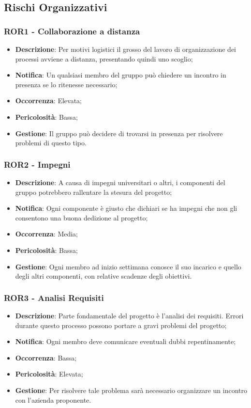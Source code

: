    \subsection{Rischi Organizzativi}

	\subsubsection*{ROR1 - Collaborazione a distanza}
	\begin{itemize}
		\item \textbf{Descrizione}: Per motivi logistici il grosso del lavoro di organizzazione dei processi avviene a distanza, presentando quindi uno scoglio;
		\item \textbf{Notifica}: Un qualsiasi membro del gruppo può chiedere un incontro in presenza se lo ritenesse necessario;
		\item \textbf{Occorrenza}: Elevata;
		\item \textbf{Pericolosità}: Bassa;
		\item \textbf{Gestione}: Il gruppo può decidere di trovarsi in presenza per risolvere problemi di questo tipo.
	\end{itemize}

	\subsubsection*{ROR2 - Impegni}
	\begin{itemize}
		\item \textbf{Descrizione}: A causa di impegni universitari o altri, i componenti del gruppo potrebbero rallentare la stesura del progetto;
		\item \textbf{Notifica}: Ogni componente è giusto che dichiari se ha  impegni che non gli consentono una buona dedizione al progetto;
		\item \textbf{Occorrenza}: Media;
		\item \textbf{Pericolosità}: Bassa;
		\item \textbf{Gestione}: Ogni membro ad inizio settimana conosce il suo incarico e quello degli altri componenti, con relative scadenze degli obiettivi.
	\end{itemize}

	\subsubsection*{ROR3 - Analisi Requisiti}
	\begin{itemize}
		\item \textbf{Descrizione}: Parte fondamentale del progetto è l'analisi dei requisiti. Errori durante questo processo possono portare a gravi problemi del progetto;
		\item \textbf{Notifica}: Ogni membro deve comunicare eventuali dubbi repentinamente;
		\item \textbf{Occorrenza}: Bassa;
		\item \textbf{Pericolosità}: Elevata;
		\item \textbf{Gestione}: Per risolvere tale problema sarà necessario organizzare un incontro con l'azienda proponente.
	\end{itemize}

